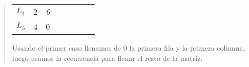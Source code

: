 \begin{quote}
\begin{table}[H]
\begin{tabular}{llllllll}
            \cellcolor[HTML]{FFFFFF}\textit{$L_4$} & \multicolumn{1}{l|}{2} & \multicolumn{1}{l|}{\cellcolor[HTML]{FFFFFF}\textit{0}} & \multicolumn{1}{l|}{\cellcolor[HTML]{FFFFFF}\textit{}}  & \multicolumn{1}{l|}{\cellcolor[HTML]{FFFFFF}\textit{}}  & \multicolumn{1}{l|}{\cellcolor[HTML]{FFFFFF}\textit{}}  & \multicolumn{1}{l|}{\cellcolor[HTML]{FFFFFF}\textit{}}  & \multicolumn{1}{l|}{}  \\ \cline{3-8} 
            $L_5$                                  & \multicolumn{1}{l|}{4} & \multicolumn{1}{l|}{0}                                  & \multicolumn{1}{l|}{}                                   & \multicolumn{1}{l|}{}                                   & \multicolumn{1}{l|}{}                                   & \multicolumn{1}{l|}{}                                   & \multicolumn{1}{l|}{}  \\ \cline{3-8} 
            \end{tabular}
    \end{table}

    Usando el primer caso llenamos de 0 la primera fila y la primera columna, luego usamos la recurrencia para llenar el resto de la matriz. \vspace{.2cm}


\end{quote}
